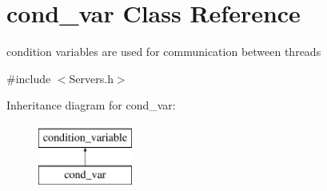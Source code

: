 \hypertarget{classcond__var}{}\section{cond\+\_\+var Class Reference}
\label{classcond__var}


condition variables are used for communication between threads  




{\ttfamily \#include $<$Servers.\+h$>$}

Inheritance diagram for cond\+\_\+var\+:\begin{figure}[H]
\begin{center}
\leavevmode
\includegraphics[height=2.000000cm]{classcond__var}
\end{center}
\end{figure}

